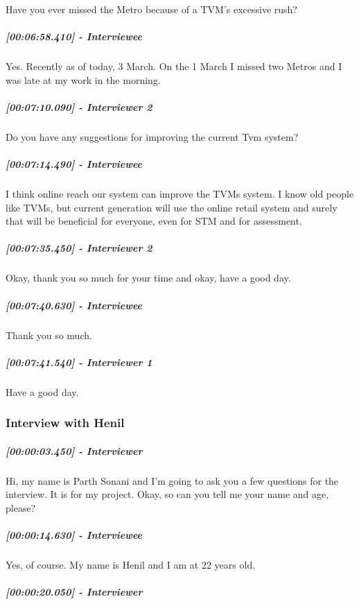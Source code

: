 \documentclass[a4paper,12pt]{article}
\begin{document}
Have you ever missed the Metro because of a TVM's excessive rush?

\hypertarget{interviewee-31}{%
\subparagraph{{[}00:06:58.410{]} - Interviewee}\label{interviewee-31}}

Yes. Recently as of today, 3 March. On the 1 March I missed two Metros
and I was late at my work in the morning.

\hypertarget{interviewer-2-17}{%
\subparagraph{{[}00:07:10.090{]} - Interviewer
2}\label{interviewer-2-17}}

Do you have any suggestions for improving the current Tvm system?

\hypertarget{interviewee-32}{%
\subparagraph{{[}00:07:14.490{]} - Interviewee}\label{interviewee-32}}

I think online reach our system can improve the TVMs system. I know old
people like TVMs, but current generation will use the online retail
system and surely that will be beneficial for everyone, even for STM and
for assessment.

\hypertarget{interviewer-2-18}{%
\subparagraph{{[}00:07:35.450{]} - Interviewer
2}\label{interviewer-2-18}}

Okay, thank you so much for your time and okay, have a good day.

\hypertarget{interviewee-33}{%
\subparagraph{{[}00:07:40.630{]} - Interviewee}\label{interviewee-33}}

Thank you so much.

\hypertarget{interviewer-1-17}{%
\subparagraph{{[}00:07:41.540{]} - Interviewer
1}\label{interviewer-1-17}}

Have a good day.

\newpage
\subsubsection{Interview with Henil}
\hypertarget{interviewer}{%
\subparagraph{{[}00:00:03.450{]} - Interviewer}\label{interviewer}}

Hi, my name is Parth Sonani and I'm going to ask you a few questions for
the interview. It is for my project. Okay, so can you tell me your name
and age, please?

\hypertarget{interviewee}{%
\subparagraph{{[}00:00:14.630{]} - Interviewee}\label{interviewee}}

Yes, of course. My name is Henil and I am at 22 years old.

\hypertarget{interviewer-1}{%
\subparagraph{{[}00:00:20.050{]} - Interviewer}\label{interviewer-1}}
\end{document}
